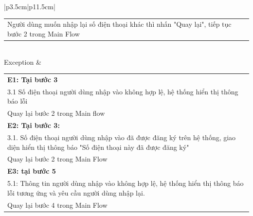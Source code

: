 \begin{enumerate}[a.]
\begin{longtable}{|p{3.5cm}|p{11.5cm}|}
\begin{tabular}[c]{@{}p{\linewidth}}
            Người dùng muốn nhập lại số điện thoại khác thì nhấn "Quay lại", tiếp tục bước 2 trong Main Flow\\
        \end{tabular} \\ 
        \hline
        Exception & \begin{tabular}[c]{@{}p{\linewidth}} 
          \textbf{E1: Tại bước 3}\\
            3.1 Số điện thoại người dùng nhập vào không hợp lệ, hệ thống hiển thị thông báo lỗi\\
            Quay lại bước 2 trong Main flow\\
          \textbf{E2: Tại bước 3:}\\
            3.1. Số điện thoại người dùng nhập vào đã được đăng ký trên hệ thống, giao diện hiển thị thông báo "Số điện thoại này đã được đăng ký"\\
            Quay lại bước 2 trong Main Flow\\
            \textbf{E3: tại bước 5}\\
            5.1: Thông tin người dùng nhập vào không hợp lệ, hệ thống hiển thị thông báo lỗi tương ứng và yêu cầu người dùng nhập lại.\\
            Quay lại bước 4 trong Main Flow
        \end{tabular} \\ 
        \hline
        \caption{Use-case đăng ký}
    \end{longtable}
\end{enumerate}

\newpage
